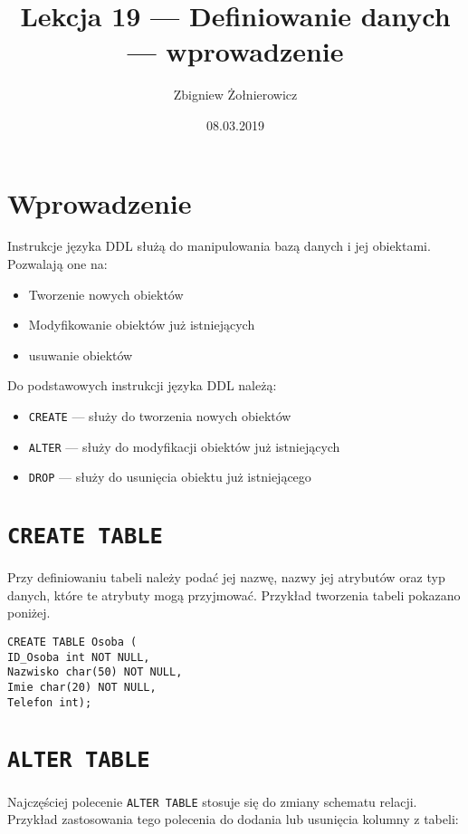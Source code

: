 \documentclass[a4paper]{article}
\begin{document}
\title{Lekcja 19 --- Definiowanie danych --- wprowadzenie}
\author{Zbigniew Żołnierowicz}
\date{08.03.2019}

\maketitle

\section{Wprowadzenie}

Instrukcje języka DDL służą do manipulowania bazą danych i jej obiektami. Pozwalają one na:
\begin{itemize}
  \item Tworzenie nowych obiektów
  \item Modyfikowanie obiektów już istniejących
  \item usuwanie obiektów
\end{itemize}
Do podstawowych instrukcji języka DDL należą:
\begin{itemize}
  \item {\tt CREATE} --- służy do tworzenia nowych obiektów
  \item {\tt ALTER} --- służy do modyfikacji obiektów już istniejących
  \item {\tt DROP} --- służy do usunięcia obiektu już istniejącego
\end{itemize}
\section{\tt CREATE TABLE}

Przy definiowaniu tabeli należy podać jej nazwę, nazwy jej atrybutów oraz typ danych, które te atrybuty mogą przyjmować. Przykład tworzenia tabeli pokazano poniżej.

\begin{verbatim}
CREATE TABLE Osoba (
ID_Osoba int NOT NULL,
Nazwisko char(50) NOT NULL,
Imie char(20) NOT NULL,
Telefon int);
\end{verbatim}

\section{\tt ALTER TABLE}

Najczęściej polecenie {\tt ALTER TABLE} stosuje się do zmiany schematu relacji. Przykład zastosowania tego polecenia do dodania lub usunięcia kolumny z tabeli:
\end{document}
